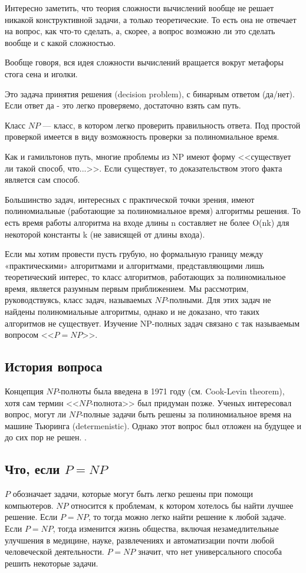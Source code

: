 \documentclass{article}
\begin{document}
Интересно заметить, что теория сложности вычислений вообще не решает никакой конструктивной задачи, а только теоретические. То есть она не отвечает на вопрос, как что-то сделать, а, скорее, а вопрос возможно ли это сделать вообще и с какой сложностью.

Вообще говоря, вся идея сложности вычислений вращается вокруг метафоры стога сена и иголки.

Это задача принятия решения (decision problem), с бинарным ответом (да/нет).
Если ответ да - это легко проверяемо, достаточно взять сам путь.

Класс $NP$ --- класс, в котором легко проверить правильность ответа. Под простой проверкой имеется в виду возможность проверки за полиномиальное время.

Как и гамильтонов путь, многие проблемы из NP имеют форму <<существует ли такой способ, что...>>. Если существует, то доказательством этого факта является сам способ.

Большинство задач, интересных с практической точки зрения, имеют полиномиальные (работающие за полиномиальное время) алгоритмы решения. То есть время работы алгоритма на входе длины n составляет не более O(nk) для некоторой константы k (не зависящей от длины входа)\cite{rain}.

Если мы хотим провести пусть грубую, но формальную границу между «практическими» алгоритмами и алгоритмами, представляющими лишь теоретический интерес, то класс алгоритмов, работающих за полиномиальное время, является разумным первым приближением.
Мы рассмотрим, руководствуясь, класс задач, называемых $NP$-полными.
Для этих задач не найдены полиномиальные алгоритмы, однако и не доказано, что таких алгоритмов не существует.
Изучение NP-полных задач связано с так называемым вопросом <<$P = NP$>>\cite{rain}.

\subsection{История вопроса}

Концепция $NP$-полноты была введена в 1971 году (см. Cook-Levin theorem), хотя сам термин <<$NP$-полнота>> был придуман позже. Ученых интересовал вопрос, могут ли $NP$-полные задачи быть решены за полиномиальное время на машине Тьюринга (determenistic). Однако этот вопрос был отложен на будущее и до сих пор не решен. 
\cite{wikinpcompleteness}.

\subsection{Что, если $P=NP$}
$P$ обозначает задачи, которые могут быть легко решены при помощи компьютеров. $NP$ относится к проблемам, к котором хотелось бы найти лучшее решение. Если $P=NP$, то тогда можно легко найти решение к любой задаче. Если $P=NP$, тогда изменится жизнь общества, включая незамедлительные улучшения в медицине, науке, развлечениях и автоматизации почти любой человеческой деятельности.
$P=NP$ значит, что нет универсального способа решить некоторые задачи.
\cite{goldenticket}
\end{document}
